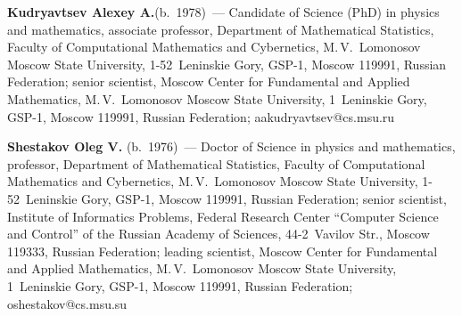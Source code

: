 \Contr

\noindent
\textbf{Kudryavtsev Alexey A.}(b.\ 1978)~--- 
Candidate of Science (PhD) in physics and mathematics, associate professor, Department of Mathematical Statistics, Faculty of
 Computational Mathematics and Cybernetics, M.\,V.~Lomonosov Moscow State University, 1-52~Leninskie Gory, GSP-1, Moscow 119991, Russian Federation; 
 senior scientist, Moscow Center for Fundamental and Applied Mathematics, M.\,V.~Lomonosov Moscow State University,
1~Leninskie Gory, GSP-1, Moscow 119991, Russian Federation; \mbox{aakudryavtsev@cs.msu.ru}


\vspace*{3pt}

\noindent
\textbf{Shestakov Oleg V.} (b.\ 1976)~--- Doctor of Science in physics and mathematics, professor, Department of Mathematical Statistics, 
Faculty of Computational Mathematics and Cybernetics, M.\,V.~Lomonosov Moscow State University, 1-52~Leninskie Gory, GSP-1, Moscow 119991, Russian Federation; 
senior scientist, Institute of Informatics Problems, Federal Research Center ``Computer Science and Control'' 
of the Russian Academy of Sciences, 44-2~Vavilov Str., Moscow 119333, Russian Federation; 
leading scientist, Moscow Center for Fundamental and Applied Mathematics, M.\,V.~Lomonosov Moscow State University, 1~Leninskie Gory, GSP-1, 
Moscow 119991, Russian Federation; \mbox{oshestakov@cs.msu.su}



\label{end\stat}

\renewcommand{\bibname}{\protect\rm Литература} 